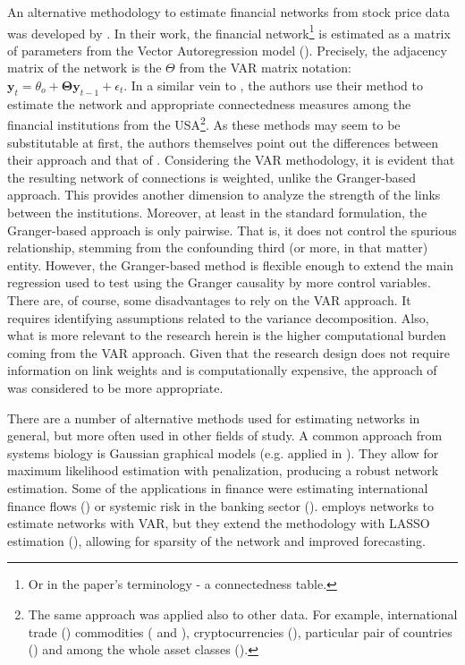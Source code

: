 \documentclass[12pt]{article}
\begin{document}
An alternative methodology to estimate financial networks from stock price data was developed by \cite{deibold14}. In their work, the financial network\footnote{Or in the paper's terminology - a connectedness table.} is estimated as a matrix of parameters from the Vector Autoregression model (\cite{sims80}). Precisely, the adjacency matrix of the network is the $\Theta$ from the VAR matrix notation: $\boldsymbol{y}_t = \theta_o + \boldsymbol{\Theta} \boldsymbol{y}_{t-1} + \epsilon_t$. In a similar vein to \cite{billio12}, the authors use their method to estimate the network and appropriate connectedness measures among the financial institutions from the USA\footnote{The same approach was applied also to other data. For example, international trade (\cite{deibold23}) commodities (\cite{diebold17} and \cite{gong22}), cryptocurrencies (\cite{ji19}), particular pair of countries (\cite{dadej23})  and among the whole asset classes (\cite{bouri21}).}. As these methods may seem to be substitutable at first, the authors themselves point out the differences between their approach and that of \cite{billio12}. Considering the VAR methodology, it is evident that the resulting network of connections is weighted, unlike the Granger-based approach. This provides another dimension to analyze the strength of the links between the institutions. Moreover, at least in the standard formulation, the Granger-based approach is only pairwise. That is, it does not control the spurious relationship, stemming from the confounding third (or more, in that matter) entity. However, the Granger-based method is flexible enough to extend the main regression used to test using the Granger causality by more control variables. There are, of course, some disadvantages to rely on the VAR approach. It requires identifying assumptions related to the variance decomposition. Also, what is more relevant to the research herein is the higher computational burden coming from the VAR approach. Given that the research design does not require information on link weights and is computationally expensive, the approach of \cite{billio12} was considered to be more appropriate.

There are a number of alternative methods used for estimating networks in general, but more often used in other fields of study. A common approach from systems biology is Gaussian graphical models (e.g. applied in \cite{friedman04}). They allow for maximum likelihood estimation with penalization, producing a robust network estimation. Some of the applications in finance were estimating international finance flows (\cite{giudici16}) or systemic risk in the banking sector (\cite{cerchiello16}). \cite{barigozzi19} employs networks to estimate networks with VAR, but they extend the methodology with LASSO estimation (\cite{breiman95}), allowing for sparsity of the network and improved forecasting.
\end{document}
